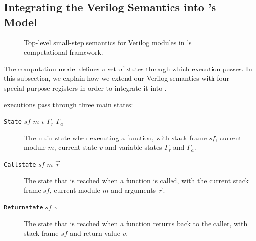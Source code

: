 \subsection{Integrating the Verilog Semantics into \compcert{}'s Model}
\label{sec:verilog:integrating}

\begin{figure*}
  \centering
  \begin{minipage}{1.0\linewidth}
  \end{minipage}
  \caption{Top-level small-step semantics for Verilog modules in \compcert{}'s computational framework.}%
  \label{fig:inference_module}
\end{figure*}

The \compcert{} computation model defines a set of states through which
execution passes. In this subsection, we explain how we extend our Verilog
semantics with four special-purpose registers in order to integrate it into
\compcert{}.

\compcert{} executions pass through three main states:
\begin{description}
\item[\texttt{State} $\mathit{sf}$ $m$ $v$ $\Gamma_{r}$ $\Gamma_{a}$] The main
  state when executing a function, with stack frame $\mathit{sf}$, current
  module $m$, current state $v$ and variable states $\Gamma_{r}$ and
  $\Gamma_{a}$.
  \item[\texttt{Callstate} $\mathit{sf}$ $m$ $\vec{r}$] The state that is
    reached when a function is called, with the current stack frame
    $\mathit{sf}$, current module $m$ and arguments $\vec{r}$.
  \item[\texttt{Returnstate} $\mathit{sf}$ $v$] The state that is reached when a
    function returns back to the caller, with stack frame $\mathit{sf}$ and
    return value $v$.
\end{description}

